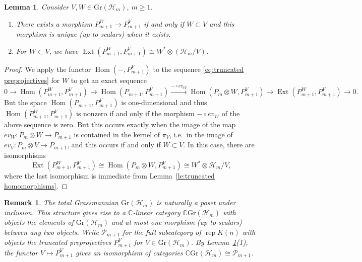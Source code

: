 \documentclass{amsart}
\newtheorem{lemma}[theorem]{Lemma}
\newtheorem{remark}[theorem]{Remark}
\numberwithin{equation}{section}
\newcommand{\CC}{\mathbb{C}}
\newcommand{\cH}{\mathcal{H}}
\newcommand{\cP}{\mathcal{P}}
\newcommand{\Ext}{\operatorname{Ext}}
\newcommand{\Gr}{\mathrm{Gr}}
\newcommand{\Hom}{\operatorname{Hom}}
\newcommand{\rep}{\operatorname{rep}}
\begin{document}
\begin{lemma}
  \label{le:unique morphisms}
  Consider $V,W\in \Gr(\cH_m)$, $m\ge1$.
  \begin{enumerate}
    \item There exists a morphism $P_{m+1}^W\to P_{m+1}^V$ if and only if $W\subset V$ and this morphism is unique (up to scalars) when it exists.
    \item For $W\subset V$, we have $\Ext(P_{m+1}^W,P_{m+1}^V)\cong W^*\otimes(\cH_m/V)$.
  \end{enumerate}
\end{lemma}
\begin{proof}
  We apply the functor $\Hom(-,P_{m+1}^V)$ to the sequence \eqref{eq:truncated preprojectives} for $W$ to get an exact sequence
  \[0\longrightarrow \Hom(P_{m+1}^W,P_{m+1}^V)\longrightarrow \Hom(P_{m+1},P_{m+1}^V)\stackrel{-\circ ev_W}{\longrightarrow} \Hom(P_m\otimes W,P_{m+1}^V)\longrightarrow \Ext(P_{m+1}^W,P_{m+1}^V)\longrightarrow 0.\]
  But the space $\Hom(P_{m+1},P_{m+1}^V)$ is one-dimensional and thus $\Hom(P_{m+1}^W,P_{m+1}^V)$ is nonzero if and only if the morphism $-\circ ev_W$ of the above sequence is zero.
  But this occurs exactly when the image of the map $ev_W:P_m\otimes W\to P_{m+1}$ is contained in the kernel of $\pi_V$, i.e.\ in the image of $ev_V:P_m\otimes V\to P_{m+1}$, and this occurs if and only if $W\subset V$. 
  In this case, there are isomorphisms
  \[\Ext(P_{m+1}^W,P_{m+1}^V)\cong\Hom(P_m\otimes W,P_{m+1}^V)\cong W^*\otimes \cH_m/V,\]
  where the last isomorphism is immediate from Lemma~\ref{le:truncated homomorphisms}.
\end{proof}
\begin{remark}
  The total Grassmannian $\Gr(\cH_m)$ is naturally a poset under inclusion.
  This structure gives rise to a $\CC$-linear category $\CC \Gr(\cH_m)$ with objects the elements of $\Gr(\cH_m)$ and at most one morphism (up to scalars) between any two objects.
  Write $\cP_{m+1}$ for the full subcategory of $\rep K(n)$ with objects the truncated preprojectives $P_{m+1}^V$ for $V\in \Gr(\cH_m)$.
  By Lemma~\ref{le:unique morphisms}(1), the functor $V\mapsto P_{m+1}^V$ gives an isomorphism of categories $\CC \Gr(\cH_m)\cong\cP_{m+1}$.
\end{remark}
\end{document}
